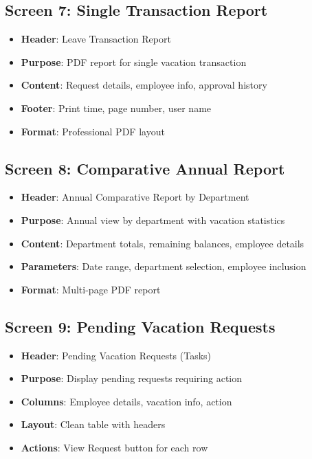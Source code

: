 \documentclass[12pt,a4paper]{article}
\begin{document}
\subsection{Screen 7: Single Transaction Report}
\begin{itemize}
    \item \textbf{Header}: Leave Transaction Report
    \item \textbf{Purpose}: PDF report for single vacation transaction
    \item \textbf{Content}: Request details, employee info, approval history
    \item \textbf{Footer}: Print time, page number, user name
    \item \textbf{Format}: Professional PDF layout
\end{itemize}

\subsection{Screen 8: Comparative Annual Report}
\begin{itemize}
    \item \textbf{Header}: Annual Comparative Report by Department
    \item \textbf{Purpose}: Annual view by department with vacation statistics
    \item \textbf{Content}: Department totals, remaining balances, employee details
    \item \textbf{Parameters}: Date range, department selection, employee inclusion
    \item \textbf{Format}: Multi-page PDF report
\end{itemize}

\subsection{Screen 9: Pending Vacation Requests}
\begin{itemize}
    \item \textbf{Header}: Pending Vacation Requests (Tasks)
    \item \textbf{Purpose}: Display pending requests requiring action
    \item \textbf{Columns}: Employee details, vacation info, action
    \item \textbf{Layout}: Clean table with headers
    \item \textbf{Actions}: View Request button for each row
\end{itemize}
\end{document}
